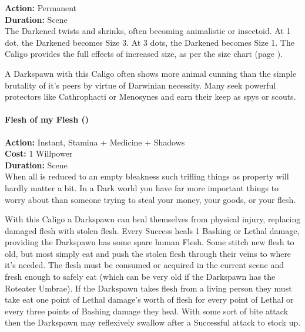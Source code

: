 \noindent \textbf{Action:} Permanent\\

\noindent \textbf{Duration:} Scene \\

\noindent The Darkened twists and shrinks, often becoming animalistic or insectoid. At 1 dot, the Darkened becomes Size 3. At 3 dots, the Darkened becomes Size 1. The Caligo provides the full effects of increased size, as per the size chart (page \pageref{SizeTable}).

A Darkspawn with this Caligo often shows more animal cunning than the simple brutality of it's peers by virtue of Darwinian necessity. Many seek powerful protectors like Cathrophacti or Menosynes and earn their keep as spys or scouts. \\

\paragraph*{Flesh of my Flesh (\textbullet\textbullet\textbullet)}

\noindent \textbf{Action:} Instant, Stamina + Medicine + Shadows\\

\noindent \textbf{Cost:} 1 Willpower\\

\noindent \textbf{Duration:} Scene \\

\noindent When all is reduced to an empty bleakness such trifling things as property will hardly matter a bit. In a Dark world you have far more important things to worry about than someone trying to steal your money, your goods, or your flesh.

With this Caligo a Darkspawn can heal themselves from physical injury, replacing damaged flesh with stolen flesh. Every Success heals 1 Bashing or Lethal damage, providing the Darkspawn has some spare human Flesh. Some stitch new flesh to old, but most simply eat and push the stolen flesh through their veins to where it's needed. The flesh must be consumed or acquired in the current scene and fresh enough to safely eat (which can be very old if the Darkspawn has the Roteater Umbrae). If the Darkspawn takes flesh from a living person they must take eat one point of Lethal damage's worth of flesh for every point of Lethal or every three points of Bashing damage they heal. With some sort of bite attack then the Darkspawn may reflexively swallow after a Successful attack to stock up.\\

